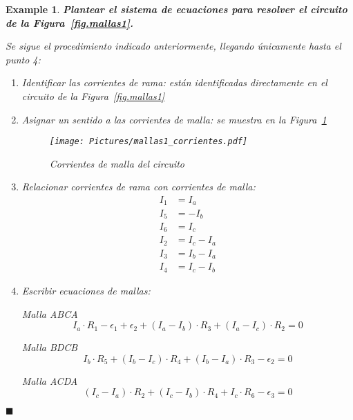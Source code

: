 \documentclass[11pt]{book} %
\numberwithin{dummy}{section}
\theoremstyle{ocrenumbox}
\theoremstyle{blacknumex}
\newtheorem{exampleT}{Example}[chapter]
\theoremstyle{blacknumbox}
\theoremstyle{ocrenum}
\newenvironment{example}{\begin{exampleT}}{\hfill{\tiny\ensuremath{\blacksquare}}\end{exampleT}}
\begin{document}
	\vspace{4mm}
	\begin{example}
		\label{ej.1-5}
		\textbf{Plantear el sistema de ecuaciones para resolver el circuito de la Figura~\ref{fig.mallas1}.}
		
		Se sigue el procedimiento indicado anteriormente, llegando únicamente hasta el punto 4: 
		\begin{enumerate}
			\item Identificar las corrientes de rama: están identificadas directamente en el circuito de la Figura~\ref{fig.mallas1}
			\item Asignar un sentido a las corrientes de malla: se muestra en la Figura~\ref{fig.mallas1_corrientes}
			\begin{figure}[htbp]
				\centering
				\texttt{[image: Pictures/mallas1\_corrientes.pdf]}
				\caption{Corrientes de malla del circuito}
				\label{fig.mallas1_corrientes}
			\end{figure}
			\item Relacionar corrientes de rama con corrientes de malla:
			\begin{align*}
				I_1 &= I_a\\
				I_5 &= -I_b\\
				I_6 &= I_c\\
				I_2 &= I_c -I_a\\
				I_3 &= I_b - I_a\\
				I_4 &= I_c - I_b
			\end{align*}
			\item Escribir ecuaciones de mallas: 
			
			Malla ABCA
			\begin{equation*}
				I_a \cdot R_1 - \epsilon_1 + \epsilon_2 + (I_a - I_b) \cdot R_3 + (I_a - I_c) \cdot R_2 = 0
			\end{equation*}
			
			Malla BDCB
			\begin{equation*}
				I_b \cdot R_5 + (I_b - I_c) \cdot R_4 + (I_b - I_a) \cdot R_3 - \epsilon_2 = 0
			\end{equation*}
			
			Malla ACDA
			\begin{equation*}
				(I_c - I_a) \cdot R_2 + (I_c - I_b) \cdot R_4 + I_c \cdot R_6 - \epsilon_3 = 0
			\end{equation*}
			

\end{enumerate}
\end{example}
\end{document}
